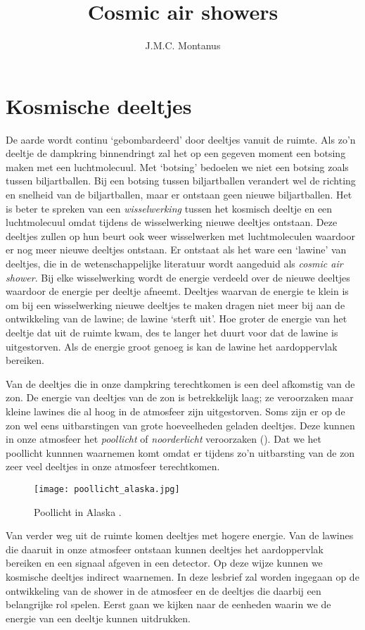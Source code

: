 

\title{Cosmic air showers}
\author{J.M.C. Montanus}



\maketitle

\section{Kosmische deeltjes}

De aarde wordt continu `gebombardeerd' door deeltjes vanuit de ruimte. Als zo'n deeltje de dampkring binnendringt zal het op een gegeven moment een botsing maken met een luchtmolecuul. Met `botsing' bedoelen we niet een botsing zoals tussen biljartballen. Bij een botsing tussen biljartballen verandert wel de richting en snelheid van de biljartballen, maar er ontstaan geen nieuwe biljartballen. Het is beter te spreken van een \emph{wisselwerking} tussen het kosmisch deeltje en een luchtmolecuul omdat tijdens de wisselwerking nieuwe deeltjes ontstaan. Deze deeltjes zullen op hun beurt ook weer wisselwerken met luchtmoleculen waardoor er nog meer nieuwe deeltjes ontstaan. Er ontstaat als het ware een `lawine' van deeltjes, die in de wetenschappelijke literatuur wordt aangeduid als \emph{cosmic air shower}. Bij elke wisselwerking wordt de energie verdeeld over de nieuwe deeltjes waardoor de energie per deeltje afneemt. Deeltjes waarvan de energie te klein is om bij een wisselwerking nieuwe deeltjes te maken dragen niet meer bij aan de ontwikkeling van de lawine; de lawine `sterft uit'. Hoe groter de energie van het deeltje dat uit de ruimte kwam, des te langer het duurt voor dat de lawine is uitgestorven. Als de energie groot genoeg is kan de lawine het aardoppervlak bereiken. 

Van de deeltjes die in onze dampkring terechtkomen is een deel afkomstig van de zon. De energie van deeltjes van de zon is betrekkelijk laag; ze veroorzaken maar kleine lawines die al hoog in de atmosfeer zijn uitgestorven. Soms zijn er op de zon wel eens uitbarstingen van grote hoeveelheden geladen deeltjes. Deze kunnen in onze atmosfeer het \emph{poollicht} of \emph{noorderlicht} veroorzaken (). Dat we het poollicht kunnnen waarnemen komt omdat er tijdens zo'n uitbarsting van de zon zeer veel deeltjes in onze atmosfeer terechtkomen.   
\begin{figure}
\centering
\texttt{[image: poollicht\_alaska.jpg]}
\caption{Poollicht in Alaska \cite{strang}.}
\label{fig:poollicht}
\end{figure}
Van verder weg uit de ruimte komen deeltjes met hogere energie. Van de lawines die daaruit in onze atmosfeer ontstaan kunnen deeltjes het aardoppervlak bereiken en een signaal afgeven in een \hisparc detector. Op deze wijze kunnen we kosmische deeltjes indirect waarnemen. In deze lesbrief zal worden ingegaan op de ontwikkeling van de shower in de atmosfeer en de deeltjes die daarbij een belangrijke rol spelen. Eerst gaan we kijken naar de eenheden waarin we de energie van een deeltje kunnen uitdrukken. 

